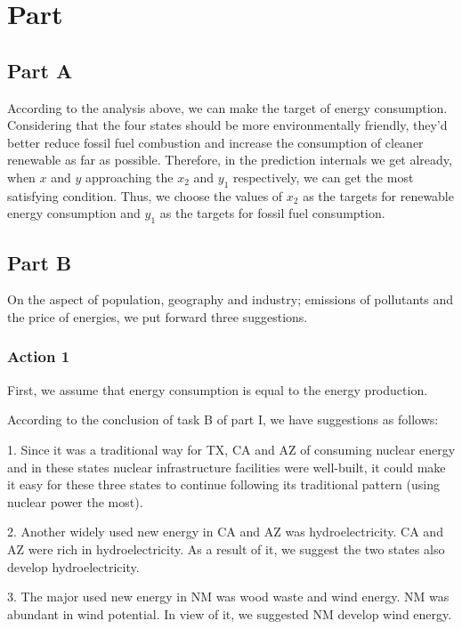 \documentclass[12pt]{article}
\begin{document}
\section{Part \uppercase\expandafter{}}

\subsection{Part \uppercase\expandafter{}  A}

According to the analysis above, we can make the target of energy consumption. Considering that the four states should be more environmentally friendly, they'd better reduce fossil fuel combustion and increase the consumption of cleaner renewable as far as possible. Therefore, in the prediction internals we get already, when $x$ and $y$ approaching the $x_{2}$ and $y_{1}$ respectively, we can get the most satisfying condition. Thus, we choose the values of $x_{2}$ as the targets for renewable energy consumption and $y_{1}$ as the targets for fossil fuel consumption.

\subsection{Part \uppercase\expandafter{}  B}

On the aspect of population, geography and industry; emissions of pollutants and the price of energies, we put forward three suggestions.

\subsubsection{Action 1}
First, we assume that energy consumption is equal to the energy production.

According to the conclusion of task B of part I, we have suggestions as follows:

1. Since it was a traditional way for TX, CA and AZ of consuming nuclear energy and in these states nuclear infrastructure facilities were well-built, it could make it easy for these three states to continue following its traditional pattern (using nuclear power the most).

2. Another widely used new energy in CA and AZ was hydroelectricity. CA and AZ were rich in hydroelectricity. As a result of it, we suggest the two states also develop hydroelectricity.

3. The major used new energy in NM was wood waste and wind energy. NM was abundant in wind potential. In view of it, we suggested NM develop wind energy.
\end{document}
